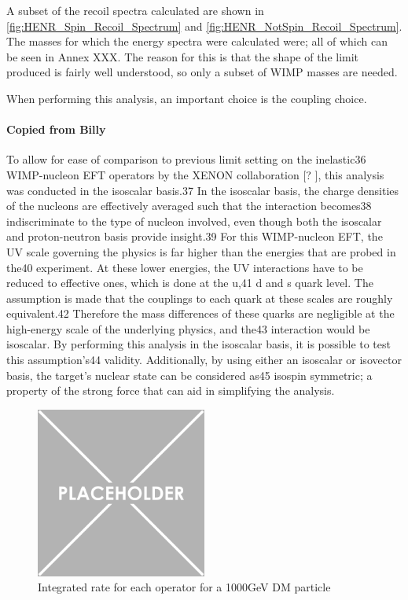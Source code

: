 \par
A subset of the recoil spectra calculated are shown in \autoref{fig:HENR_Spin_Recoil_Spectrum} and \autoref{fig:HENR_NotSpin_Recoil_Spectrum}.
The masses for which the energy spectra were calculated were;
all of which can be seen in Annex XXX.
The reason for this is that the shape of the limit produced is fairly well understood, so only a subset of WIMP masses are needed.



\par
When performing this analysis, an important choice is the coupling choice.


\paragraph{Copied from Billy}
\par
To allow for ease of comparison to previous limit setting on the inelastic36
WIMP-nucleon EFT operators by the XENON collaboration [? ], this analysis was conducted in the isoscalar basis.37
In the isoscalar basis, the charge densities of the nucleons are effectively averaged such that the interaction becomes38
indiscriminate to the type of nucleon involved, even though both the isoscalar and proton-neutron basis provide insight.39
For this WIMP-nucleon EFT, the UV scale governing the physics is far higher than the energies that are probed in the40
experiment. At these lower energies, the UV interactions have to be reduced to effective ones, which is done at the u,41
d and s quark level. The assumption is made that the couplings to each quark at these scales are roughly equivalent.42
Therefore the mass differences of these quarks are negligible at the high-energy scale of the underlying physics, and the43
interaction would be isoscalar. By performing this analysis in the isoscalar basis, it is possible to test this assumption’s44
validity. Additionally, by using either an isoscalar or isovector basis, the target’s nuclear state can be considered as45
isospin symmetric; a property of the strong force that can aid in simplifying the analysis.

\begin{figure}
    \centering
    \includegraphics[width=0.5\textwidth]{Figures/Placeholder.png}
    \caption{Integrated rate for each operator for a 1000GeV DM particle}
    \label{fig:operator_integrated_rate}
\end{figure}

